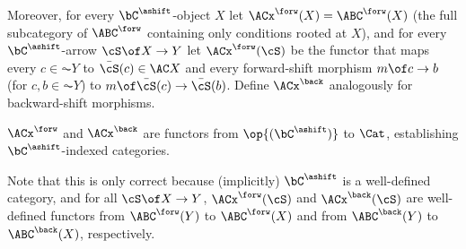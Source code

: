 Moreover, for every $\bC^\ashift$-object $X$ let $\ACx^\forw(X)=\ABC^\forw(X)$ (the full subcategory of $\ABC^\forw$ containing only conditions rooted at $X$), and for every $\bC^\ashift$-arrow $\cS\of X\to Y$ let $\ACx^\forw(\cS)$ be the functor that maps every $c\in \AC Y$ to $\bar\cS(c)\in \AC X$ and every forward-shift morphism $m\of c\to b$ (for $c,b\in \AC Y$) to $m\of \bar\cS(c)\to \bar\cS(b)$. Define $\ACx^\back$ analogously for backward-shift morphisms.

\begin{proposition}
$\ACx^\forw$ and $\ACx^\back$ are functors from $\op{(\bC^\ashift)}$ to $\Cat$, establishing $\bC^\ashift$-indexed categories.
\end{proposition}
%
Note that this is only correct because (implicitly) $\bC^\ashift$ is a well-defined category, and for all $\cS\of X\to Y$, $\ACx^\forw(\cS)$ and $\ACx^\back(\cS)$ are well-defined functors from $\ABC^\forw(Y)$ to $\ABC^\forw(X)$ and from $\ABC^\back(Y)$ to $\ABC^\back(X)$, respectively.
